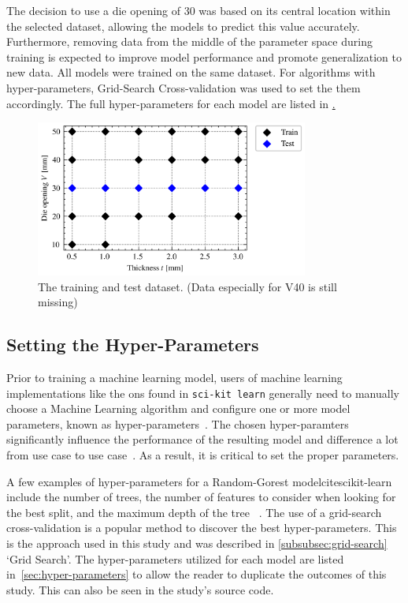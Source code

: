 The decision to use a die opening of 30 was based on its central location within the selected dataset, allowing the
models to predict this value accurately. Furthermore, removing data from the middle of the parameter space during
training is expected to improve model performance and promote generalization to new data.
All models were trained on the same dataset.
For algorithms with hyper-parameters, Grid-Search Cross-validation was used to set the them accordingly.
The full hyper-parameters for each model are listed in \href{sec:hyper-parameters}.

\begin{figure}[ht]
    \begin{tcolorbox}[arc=0pt,boxrule=0.5pt]
        \centering
        \includegraphics[width=0.8\textwidth]{chap4/images/test_train_split}
    \end{tcolorbox}
    \caption{The training and test dataset. (Data especially for V40 is
    still missing)}
    \label{fig:train_test_split}
\end{figure}

\subsection{Setting the Hyper-Parameters}\label{subsec:hyper-parameters}
Prior to training a machine learning model, users of machine learning implementations like the ons found in
\texttt{sci-kit learn} generally need to manually choose a Machine Learning algorithm and configure one or more model
parameters, known as hyper-parameters~\cite[pp. 1]{claesen2015hyperparameter}.
The chosen hyper-paramters significantly influence the performance of the resulting model and difference a lot from use
case to use case~\cite[pp. 1]{claesen2015hyperparameter}.
As a result, it is critical to set the proper parameters.

A few examples of hyper-parameters for a Random-Gorest modelcitescikit-learn include the number of trees, the number
of features to consider when looking for the best split, and the maximum depth of the tree
~\cite{scikit-learn}.
The use of a grid-search cross-validation is a popular method to discover the best hyper-parameters.
This is the approach used in this study and was described in \cref{subsubsec:grid-search} `Grid Search'.
The hyper-parameters utilized for each model are listed in~\cref{sec:hyper-parameters} to allow the reader to
duplicate the outcomes of this study.
This can also be seen in the study's source code.


